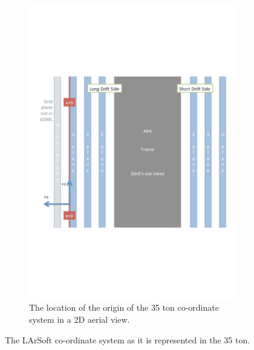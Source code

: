 \begin{figure}[h]
\begin{subfigure}{0.45\textwidth}
    \includegraphics[width=\textwidth]{35ton_xCenter}
    \caption{The location of the origin of the 35 ton co-ordinate system in a 2D aerial view.}
  \end{subfigure}
  \caption[The LArSoft co-ordinate system as it is represented in the 35 ton.]
          {The LArSoft co-ordinate system as it is represented in the 35 ton.}
  \label{fig:LArSoft_coords}
\end{figure}

